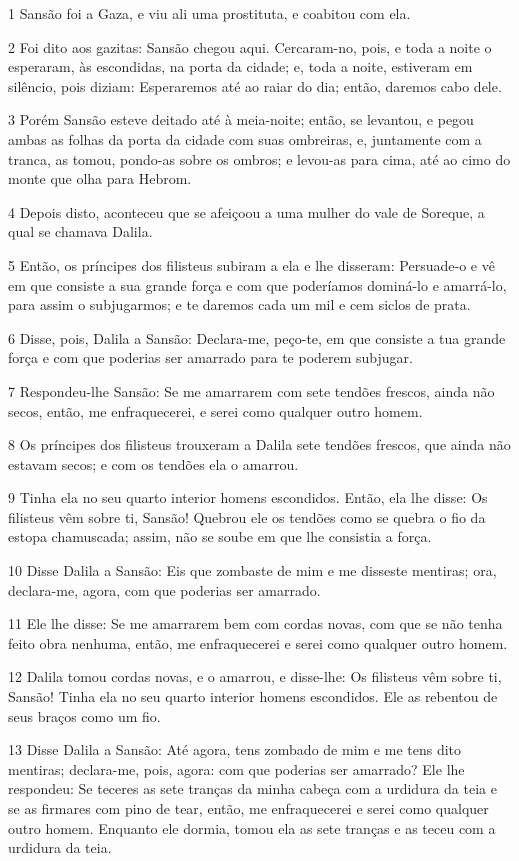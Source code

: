 \par 1 Sansão foi a Gaza, e viu ali uma prostituta, e coabitou com ela.
\par 2 Foi dito aos gazitas: Sansão chegou aqui. Cercaram-no, pois, e toda a noite o esperaram, às escondidas, na porta da cidade; e, toda a noite, estiveram em silêncio, pois diziam: Esperaremos até ao raiar do dia; então, daremos cabo dele.
\par 3 Porém Sansão esteve deitado até à meia-noite; então, se levantou, e pegou ambas as folhas da porta da cidade com suas ombreiras, e, juntamente com a tranca, as tomou, pondo-as sobre os ombros; e levou-as para cima, até ao cimo do monte que olha para Hebrom.
\par 4 Depois disto, aconteceu que se afeiçoou a uma mulher do vale de Soreque, a qual se chamava Dalila.
\par 5 Então, os príncipes dos filisteus subiram a ela e lhe disseram: Persuade-o e vê em que consiste a sua grande força e com que poderíamos dominá-lo e amarrá-lo, para assim o subjugarmos; e te daremos cada um mil e cem siclos de prata.
\par 6 Disse, pois, Dalila a Sansão: Declara-me, peço-te, em que consiste a tua grande força e com que poderias ser amarrado para te poderem subjugar.
\par 7 Respondeu-lhe Sansão: Se me amarrarem com sete tendões frescos, ainda não secos, então, me enfraquecerei, e serei como qualquer outro homem.
\par 8 Os príncipes dos filisteus trouxeram a Dalila sete tendões frescos, que ainda não estavam secos; e com os tendões ela o amarrou.
\par 9 Tinha ela no seu quarto interior homens escondidos. Então, ela lhe disse: Os filisteus vêm sobre ti, Sansão! Quebrou ele os tendões como se quebra o fio da estopa chamuscada; assim, não se soube em que lhe consistia a força.
\par 10 Disse Dalila a Sansão: Eis que zombaste de mim e me disseste mentiras; ora, declara-me, agora, com que poderias ser amarrado.
\par 11 Ele lhe disse: Se me amarrarem bem com cordas novas, com que se não tenha feito obra nenhuma, então, me enfraquecerei e serei como qualquer outro homem.
\par 12 Dalila tomou cordas novas, e o amarrou, e disse-lhe: Os filisteus vêm sobre ti, Sansão! Tinha ela no seu quarto interior homens escondidos. Ele as rebentou de seus braços como um fio.
\par 13 Disse Dalila a Sansão: Até agora, tens zombado de mim e me tens dito mentiras; declara-me, pois, agora: com que poderias ser amarrado? Ele lhe respondeu: Se teceres as sete tranças da minha cabeça com a urdidura da teia e se as firmares com pino de tear, então, me enfraquecerei e serei como qualquer outro homem. Enquanto ele dormia, tomou ela as sete tranças e as teceu com a urdidura da teia.
